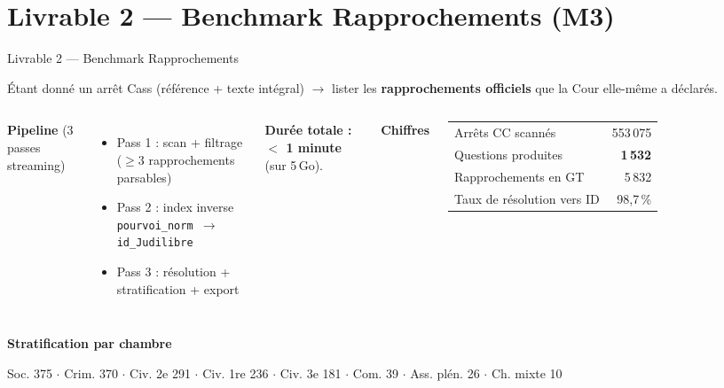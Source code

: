 \documentclass[aspectratio=169,10pt]{beamer}
\newcommand{\keybox}[1]{%
  \begin{center}
  \colorbox{accentsoft}{\parbox{0.92\linewidth}{\centering #1}}
  \end{center}}
\begin{document}
\section{Livrable 2 --- Benchmark Rapprochements (M3)}

\begin{frame}{Livrable 2 --- Benchmark Rapprochements}
  \keybox{\small Étant donné un arrêt Cass (référence + texte intégral) $\to$ lister les \textbf{rapprochements officiels} que la Cour elle-même a déclarés.}

  \begin{columns}[T]
    \textbf{Pipeline} (3 passes streaming)
    \begin{itemize}\footnotesize
      \item Pass 1 : scan + filtrage (${\geq}3$ rapprochements parsables)
      \item Pass 2 : index inverse \texttt{pourvoi\_norm $\to$ id\_Judilibre}
      \item Pass 3 : résolution + stratification + export
    \end{itemize}

    \vspace{0.2em}
    \textbf{Durée totale : $<$ 1 minute} (sur 5\,Go).

    \textbf{Chiffres}
    \vspace{0.2em}
    \footnotesize
    \begin{tabular}{@{}l r@{}}
      \toprule
      Arrêts CC scannés & 553\,075 \\
      Questions produites & \textbf{1\,532} \\
      Rapprochements en GT & 5\,832 \\
      Taux de résolution vers ID & 98{,}7\,\% \\
      \bottomrule
    \end{tabular}
  \end{columns}

  \vspace{0.5em}
  \textbf{Stratification par chambre}

  \scriptsize
  Soc. 375 $\cdot$ Crim. 370 $\cdot$ Civ. 2e 291 $\cdot$ Civ. 1re 236 $\cdot$ Civ. 3e 181 $\cdot$ Com. 39 $\cdot$ Ass. plén. 26 $\cdot$ Ch. mixte 10
\end{frame}
\end{document}
